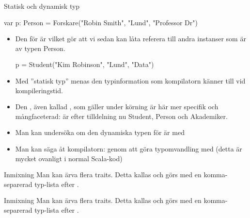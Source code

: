 \begin{Slide}{Statisk och dynamisk typ}\SlideFontSmall
\begin{Code}
    var p: Person = Forskare("Robin Smith", "Lund", "Professor Dr")
\end{Code}
\begin{itemize}
\item Den  för  är  vilket gör att vi sedan kan låta  referera till andra instanser som är av typen Person.
\begin{Code}
p = Student("Kim Robinson", "Lund", "Data")
\end{Code}

\pause

\item Med ''statisk typ'' menas den typinformation som kompilatorn känner till vid kompileringstid.

\pause
\item Den , även kallad , som gäller under körning är här mer specifik och mångfaceterad:  är efter tilldelning nu Student, Person och Akademiker.

\pause

\item Man kan undersöka om den dynamiska typen för  är  med \\ 

\pause

\item Man kan säga åt kompilatorn:  genom att göra typomvandling  med    
   (detta är mycket ovanligt i normal Scala-kod)
\end{itemize}
\end{Slide}



\ifkompendium
\begin{Slide}{Inmixning}\SlideFontTiny
Man kan ärva flera traits. Detta kallas   och görs med en komma-separerad typ-lista efter .
\end{Slide}
\else
\begin{Slide}{Inmixning}\SlideFontTiny
Man kan ärva flera traits. Detta kallas   och görs med en komma-separerad typ-lista efter .
\end{Slide}
\fi



